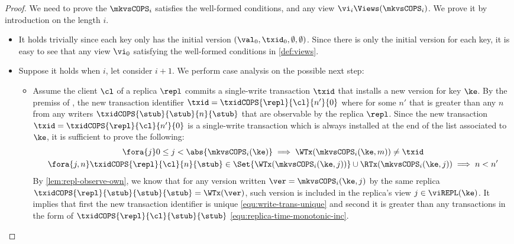 \begin{proof}
    We need to prove the  \( \mkvsCOPS_i \) satisfies the well-formed conditions,
    and any view \( \vi_i \Views(\mkvsCOPS_i) \).
    We prove it by introduction on the length \( i \).
    \begin{itemize}
    \item {}
        It holds trivially since each key only has the initial version \( (\val_0,\txid_0,\emptyset, \emptyset) \).
        Since there is only the initial version for each key, it is easy to see that any view \( \vi_0 \) satisfying the well-formed conditions in \cref{def:views}.
    \item {}
        Suppose it holds when \( i \), let consider \( i + 1 \).
        We perform case analysis on the possible next step:
        \begin{itemize}
            \item {}
                Assume the client \( \cl \) of a replica \( \repl \) commits a single-write transaction \( \txid \) that installs a new version for key \( \ke \).
                By the premiss of , the new transaction identifier \( \txid = \txidCOPS{\repl}{\cl}{n'}{0} \) where for some \( n' \) that is greater than any \( n \) from any writers \( \txidCOPS{\stub}{\stub}{n}{\stub} \) that are observable by the replica \( \repl \).
                Since the new transaction \( \txid = \txidCOPS{\repl}{\cl}{n'}{0} \) is a single-write transaction which is always installed at the end of the list associated to \( \ke \), it is sufficient to prove the following:
                \begin{gather}
                    \fora{j} 0 \leq j < \abs{ \mkvsCOPS_i(\ke) } \implies \WTx(\mkvsCOPS_{i}(\ke, m)) \neq \txid \label{equ:write-trans-unique} \\
                    \fora{j, n} \txidCOPS{\repl}{\cl}{n}{\stub} \in \Set{\WTx(\mkvsCOPS_{i}(\ke,j))} \cup \RTx(\mkvsCOPS_{i}(\ke, j)) \implies n < n' \label{equ:replica-time-monotonic-inc}
                \end{gather}
                By \cref{lem:repl-observe-own}, we know that for any version written \( \ver = \mkvsCOPS_i(\ke, j) \) by the same replica \( \txidCOPS{\repl}{\stub}{\stub}{\stub} = \WTx(\ver) \), such version is included in the replica's view \( j \in \viREPL(\ke) \).
                It implies that first the new transaction identifier is unique \cref{equ:write-trans-unique} and second it is greater than any transactions in the form of \( \txidCOPS{\repl}{\cl}{\stub}{\stub} \) \cref{equ:replica-time-monotonic-inc}.

\end{itemize}
\end{itemize}
\end{proof}
